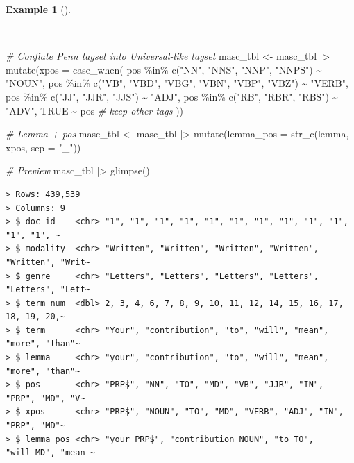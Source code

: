 \documentclass[
  letterpaper,
  DIV=11,
  numbers=noendperiod]{scrreport}
\newenvironment{Shaded}{\begin{snugshade}}{\end{snugshade}}
\newcommand{\AttributeTok}[1]{\textcolor[rgb]{0.00,0.00,0.00}{#1}}
\newcommand{\CommentTok}[1]{\textcolor[rgb]{0.00,0.00,0.00}{\textit{#1}}}
\newcommand{\ConstantTok}[1]{\textcolor[rgb]{0.00,0.00,0.00}{#1}}
\newcommand{\FunctionTok}[1]{\textcolor[rgb]{0.00,0.00,0.00}{#1}}
\newcommand{\NormalTok}[1]{\textcolor[rgb]{0.00,0.00,0.00}{#1}}
\newcommand{\OtherTok}[1]{\textcolor[rgb]{0.00,0.00,0.00}{#1}}
\newcommand{\SpecialCharTok}[1]{\textcolor[rgb]{0.00,0.00,0.00}{#1}}
\newcommand{\StringTok}[1]{\textcolor[rgb]{0.00,0.00,0.00}{#1}}
\theoremstyle{definition}
\newtheorem{example}{Example}[chapter]
\theoremstyle{remark}
\begin{document}
\begin{example}[]\protect\hypertarget{exm-eda-masc-vsm-lemma-pos}{}\label{exm-eda-masc-vsm-lemma-pos}

~

\begin{Shaded}
\begin{Highlighting}[]
\CommentTok{\# Conflate Penn tagset into Universal{-}like tagset}
\NormalTok{masc\_tbl }\OtherTok{\textless{}{-}} 
\NormalTok{  masc\_tbl }\SpecialCharTok{|\textgreater{}} 
  \FunctionTok{mutate}\NormalTok{(}\AttributeTok{xpos =} \FunctionTok{case\_when}\NormalTok{(}
\NormalTok{    pos }\SpecialCharTok{\%in\%} \FunctionTok{c}\NormalTok{(}\StringTok{"NN"}\NormalTok{, }\StringTok{"NNS"}\NormalTok{, }\StringTok{"NNP"}\NormalTok{, }\StringTok{"NNPS"}\NormalTok{) }\SpecialCharTok{\textasciitilde{}} \StringTok{"NOUN"}\NormalTok{,}
\NormalTok{    pos }\SpecialCharTok{\%in\%} \FunctionTok{c}\NormalTok{(}\StringTok{"VB"}\NormalTok{, }\StringTok{"VBD"}\NormalTok{, }\StringTok{"VBG"}\NormalTok{, }\StringTok{"VBN"}\NormalTok{, }\StringTok{"VBP"}\NormalTok{, }\StringTok{"VBZ"}\NormalTok{) }\SpecialCharTok{\textasciitilde{}} \StringTok{"VERB"}\NormalTok{,}
\NormalTok{    pos }\SpecialCharTok{\%in\%} \FunctionTok{c}\NormalTok{(}\StringTok{"JJ"}\NormalTok{, }\StringTok{"JJR"}\NormalTok{, }\StringTok{"JJS"}\NormalTok{) }\SpecialCharTok{\textasciitilde{}} \StringTok{"ADJ"}\NormalTok{,}
\NormalTok{    pos }\SpecialCharTok{\%in\%} \FunctionTok{c}\NormalTok{(}\StringTok{"RB"}\NormalTok{, }\StringTok{"RBR"}\NormalTok{, }\StringTok{"RBS"}\NormalTok{) }\SpecialCharTok{\textasciitilde{}} \StringTok{"ADV"}\NormalTok{,}
    \ConstantTok{TRUE} \SpecialCharTok{\textasciitilde{}}\NormalTok{ pos }\CommentTok{\# keep other tags}
\NormalTok{  ))}

\CommentTok{\# Lemma + pos}
\NormalTok{masc\_tbl }\OtherTok{\textless{}{-}} 
\NormalTok{  masc\_tbl }\SpecialCharTok{|\textgreater{}} 
  \FunctionTok{mutate}\NormalTok{(}\AttributeTok{lemma\_pos =} \FunctionTok{str\_c}\NormalTok{(lemma, xpos, }\AttributeTok{sep =} \StringTok{"\_"}\NormalTok{))}

\CommentTok{\# Preview}
\NormalTok{masc\_tbl }\SpecialCharTok{|\textgreater{}} \FunctionTok{glimpse}\NormalTok{()}
\end{Highlighting}
\end{Shaded}

\begin{verbatim}
> Rows: 439,539
> Columns: 9
> $ doc_id    <chr> "1", "1", "1", "1", "1", "1", "1", "1", "1", "1", "1", "1", ~
> $ modality  <chr> "Written", "Written", "Written", "Written", "Written", "Writ~
> $ genre     <chr> "Letters", "Letters", "Letters", "Letters", "Letters", "Lett~
> $ term_num  <dbl> 2, 3, 4, 6, 7, 8, 9, 10, 11, 12, 14, 15, 16, 17, 18, 19, 20,~
> $ term      <chr> "Your", "contribution", "to", "will", "mean", "more", "than"~
> $ lemma     <chr> "your", "contribution", "to", "will", "mean", "more", "than"~
> $ pos       <chr> "PRP$", "NN", "TO", "MD", "VB", "JJR", "IN", "PRP", "MD", "V~
> $ xpos      <chr> "PRP$", "NOUN", "TO", "MD", "VERB", "ADJ", "IN", "PRP", "MD"~
> $ lemma_pos <chr> "your_PRP$", "contribution_NOUN", "to_TO", "will_MD", "mean_~
\end{verbatim}


\end{example}
\end{document}
